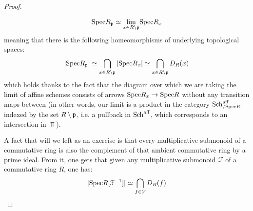 \begin{proof}
\begin{enumerate}
                                $$\mathrm{Spec} R_{\mathfrak{p}} \simeq \underset{x \in R \setminus \mathfrak{p}}{\operatorname{lim}} \mathrm{Spec} R_x$$
                            meaning that there is the following homeomorphisms of underlying topological spaces:
                                $$|\mathrm{Spec} R_{\mathfrak{p}}| \simeq \bigcap_{x \in R \setminus \mathfrak{p}} |\mathrm{Spec} R_x| \simeq \bigcap_{x \in R \setminus \mathfrak{p}} D_R(x)$$
                            which holds thanks to the fact that the diagram over which we are taking the limit of affine schemes consists of arrows $\mathrm{Spec} R_x \to \mathrm{Spec} R$ without any transition maps between (in other words, our limit is a product in the category $\mathrm{Sch}^{\mathrm{aff}}_{/\mathrm{Spec} R}$ indexed by the set $R \setminus \mathfrak{p}$, i.e. a pullback in $\mathrm{Sch}^{\mathrm{aff}}$, which corresponds to an intersection in $\Top$). 
                        \end{enumerate}
                        A fact that will we left as an exercise is that every multiplicative submonoid of a commutative ring is also the complement of that ambient commutative ring by a prime ideal. From it, one gets that given any multiplicative submonoid $\mathcal{F}$ of a commutative ring $R$, one has:
                            $$|\mathrm{Spec} R[\mathcal{F}^{-1}]| \simeq \bigcap_{f \in \mathcal{F}} D_R(f) $$
                    \end{proof}
